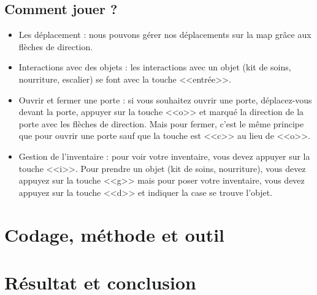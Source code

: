 \documentclass[12pt]{report}
\begin{document}
	\section{Comment jouer ?}
		\begin{itemize}
			\item{Les déplacement :}
				nous pouvons gérer nos déplacements sur la map grâce aux flèches de direction. 
			\item{Interactions avec des objets :}	
				les interactions avec un objet (kit de soins, nourriture, escalier) se font avec la touche <<entrée>>.
			\item{Ouvrir et fermer une porte :}	
				si vous souhaitez ouvrir une porte, déplacez-vous devant la porte, appuyer sur la touche <<o>> et marqué la direction de la porte avec les flèches de direction.
				Mais pour fermer, c'est le même principe que pour ouvrir une porte sauf que la touche est <<c>> au lieu de <<o>>.
			\item{Gestion de l'inventaire :}
				pour voir votre inventaire, vous devez appuyer sur la touche <<i>>. Pour prendre un objet (kit de soins, nourriture), vous devez appuyez sur la touche <<g>> mais pour poser votre inventaire, vous devez appuyez sur la touche <<d>> et indiquer la case  se trouve l'objet.
		\end{itemize}
		
		
\chapter{Codage, méthode et outil}

\chapter{Résultat et conclusion}
\end{document}
